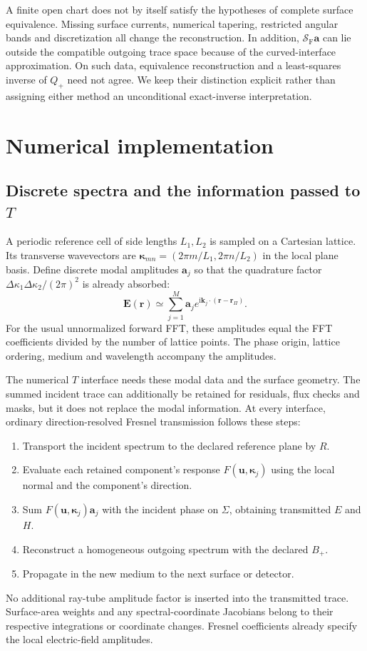 \documentclass[11pt,a4paper]{article}
\newcommand{\vct}[1]{\bm{#1}}
\newcommand{\kap}{\vct\kappa}
\newcommand{\ii}{\mathrm i}
\newcommand{\SF}{\mathcal S_{\mathrm F}}
\numberwithin{equation}{section}
\begin{document}
A finite open chart does not by itself satisfy the hypotheses of complete
surface equivalence. Missing surface currents, numerical tapering, restricted
angular bands and discretization all change the reconstruction. In addition,
$\SF\vct a$ can lie outside the compatible outgoing trace space because of
the curved-interface approximation. On such data, equivalence reconstruction
and a least-squares inverse of $Q_+$ need not agree. We keep their distinction
explicit rather than assigning either method an unconditional exact-inverse
interpretation.

\section{Numerical implementation}
\label{sec:numerics}

\subsection{Discrete spectra and the information passed to \texorpdfstring{$T$}{T}}

A periodic reference cell of side lengths $L_1,L_2$ is sampled on a Cartesian
lattice. Its transverse wavevectors are
$\kap_{mn}=(2\pi m/L_1,2\pi n/L_2)$ in the local plane basis. Define discrete
modal amplitudes $\vct a_j$ so that the quadrature factor
$\Delta\kappa_1\Delta\kappa_2/(2\pi)^2$ is already absorbed:
\begin{equation}
 \vct E(\vct r)\simeq\sum_{j=1}^M\vct a_j
          e^{\ii\vct k_j\cdot(\vct r-\vct r_\Pi)}.
 \label{eq:discrete}
\end{equation}
For the usual unnormalized forward FFT, these amplitudes equal the FFT
coefficients divided by the number of lattice points. The phase origin,
lattice ordering, medium and wavelength accompany the amplitudes.

The numerical $T$ interface needs these modal data and the surface geometry.
The summed incident trace can additionally be retained for residuals, flux
checks and masks, but it does not replace the modal information. At every
interface, ordinary direction-resolved Fresnel transmission follows these
steps:
\begin{enumerate}
 \item Transport the incident spectrum to the declared reference plane by $R$.
 \item Evaluate each retained component's response
       $F(\vct u,\kap_j)$ using the local normal and the component's direction.
 \item Sum $F(\vct u,\kap_j)\vct a_j$ with the incident phase on $\Sigma$,
       obtaining transmitted $E$ and $H$.
 \item Reconstruct a homogeneous outgoing spectrum with the declared $B_+$.
 \item Propagate in the new medium to the next surface or detector.
\end{enumerate}
No additional ray-tube amplitude factor is inserted into the transmitted
trace. Surface-area weights and any spectral-coordinate Jacobians belong to
their respective integrations or coordinate changes. Fresnel coefficients
already specify the local electric-field amplitudes.
\end{document}
